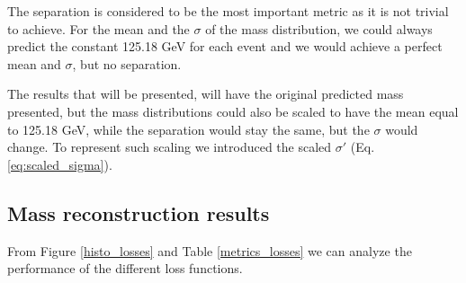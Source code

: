 \documentclass{ctuthesis}
\begin{document}
The separation is considered to be the most important metric as it is not trivial to achieve. For the mean and the $\sigma$ of the mass distribution, we could always predict the constant 125.18 GeV for each event and we would achieve a perfect mean and $\sigma$, but no separation.

The results that will be presented, will have the original predicted mass presented, but the mass distributions could also be scaled to have the mean equal to 125.18 GeV, while the separation would stay the same, but the $\sigma$ would change. To represent such scaling we introduced the scaled $\sigma'$ (Eq. \ref{eq:scaled_sigma}).
 
\subsection{Mass reconstruction results}
 
From Figure \ref{histo_losses} and Table \ref{metrics_losses} we can analyze the performance of the different loss functions.

\begin{figure}[h]
\end{figure}
\end{document}
